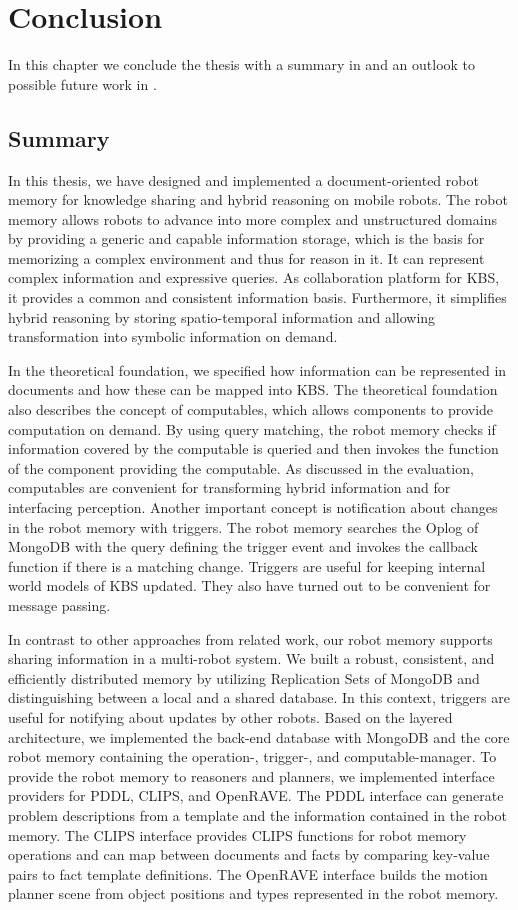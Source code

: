 \chapter{Conclusion}
\label{chap:conclusion}
In this chapter we conclude the thesis with a summary in
 and an outlook to possible future work in
.

\section{Summary}
\label{sec:summary}
In this thesis, we have designed and implemented a document-oriented
robot memory for knowledge sharing and hybrid reasoning on mobile
robots. The robot memory allows robots to advance into more complex
and unstructured domains by providing a generic and capable
information storage, which is the basis for memorizing a complex
environment and thus for reason in it. It can represent complex
information and expressive queries. As collaboration platform for KBS,
it provides a common and consistent information basis. Furthermore, it
simplifies hybrid reasoning by storing spatio-temporal information and
allowing transformation into symbolic information on demand.

In the theoretical foundation, we specified how information can be
represented in documents and how these can be mapped into KBS. The
theoretical foundation also describes the concept of computables,
which allows components to provide computation on demand. By using
query matching, the robot memory checks if information covered by the
computable is queried and then invokes the function of the component
providing the computable. As discussed in the evaluation, computables
are convenient for transforming hybrid information and for interfacing
perception.
%
Another important concept is notification about changes in the robot
memory with triggers. The robot memory searches the Oplog of MongoDB
with the query defining the trigger event and invokes the callback
function if there is a matching change. Triggers are useful for
keeping internal world models of KBS updated. They also have turned
out to be convenient for message passing.

In contrast to other approaches from related work, our robot memory
supports sharing information in a multi-robot system. We built a
robust, consistent, and efficiently distributed memory by utilizing
Replication Sets of MongoDB and distinguishing between a local and a
shared database. In this context, triggers are useful for notifying
about updates by other robots.
%
Based on the layered architecture, we implemented the back-end
database with MongoDB and the core robot memory containing the
operation-, trigger-, and computable-manager. To provide the robot
memory to reasoners and planners, we implemented interface providers
for PDDL, CLIPS, and OpenRAVE. The PDDL interface can generate problem
descriptions from a template and the information contained in the
robot memory. The CLIPS interface provides CLIPS functions for robot
memory operations and can map between documents and facts by comparing
key-value pairs to fact template definitions. The OpenRAVE interface
builds the motion planner scene from object positions and types
represented in the robot memory.

